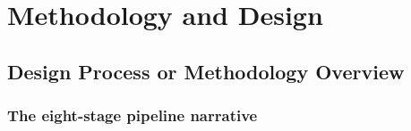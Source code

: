 %
%

\chapter{Methodology and Design}
\label{ch:methodology}


\section{Design Process or Methodology Overview}
\label{sec:design-process}

\subsection{The eight-stage pipeline narrative}
\label{sec:overview-pipeline}


